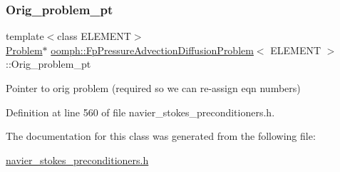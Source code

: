\subsubsection{\texorpdfstring{Orig\+\_\+problem\+\_\+pt}{Orig\_problem\_pt}}
{\footnotesize\ttfamily template$<$class E\+L\+E\+M\+E\+NT$>$ \\
\hyperlink{classoomph_1_1Problem}{Problem}$\ast$ \hyperlink{classoomph_1_1FpPressureAdvectionDiffusionProblem}{oomph\+::\+Fp\+Pressure\+Advection\+Diffusion\+Problem}$<$ E\+L\+E\+M\+E\+NT $>$\+::Orig\+\_\+problem\+\_\+pt\hspace{0.3cm}{\ttfamily [private]}}



Pointer to orig problem (required so we can re-\/assign eqn numbers) 



Definition at line 560 of file navier\+\_\+stokes\+\_\+preconditioners.\+h.



The documentation for this class was generated from the following file\+:\begin{DoxyCompactItemize}
\item 
\hyperlink{navier__stokes__preconditioners_8h}{navier\+\_\+stokes\+\_\+preconditioners.\+h}\end{DoxyCompactItemize}
